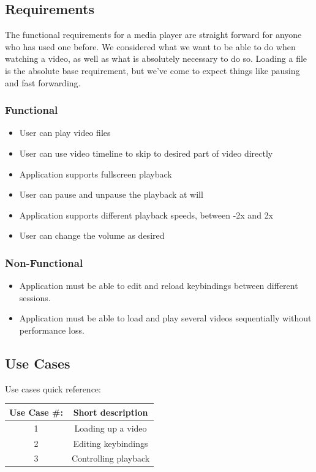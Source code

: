 \documentclass[10pt,conference,onecolumn,compsoc]{IEEEtran}
\begin{document}
\subsection{Requirements}
The functional requirements for a media player are straight forward for anyone who has used one before. We considered what we want to be able to do when watching a video, as well as what is absolutely necessary to do so. Loading a file is the absolute base requirement, but we've come to expect things like pausing and fast forwarding.

\subsubsection{Functional}
\begin{itemize}
\item User can play video files
\item User can use video timeline to skip to desired part of video directly
\item Application supports fullscreen playback 
\item User can pause and unpause the playback at will
\item Application supports different playback speeds, between -2x and 2x
\item User can change the volume as desired
\end{itemize}


\subsubsection{Non-Functional}
\begin{itemize}
\item Application must be able to edit and reload keybindings between different sessions. 
\item Application must be able to load and play several videos sequentially without performance loss.
\end{itemize}

\subsection{Use Cases}
\begin{center}
Use cases quick reference:
\begin{tabular}{c | c}
Use Case \#: & Short description \\
\hline
1 & Loading up a video \\
2 & Editing keybindings \\
3 & Controlling playback \\
\end{tabular}
\end{center}
\end{document}
